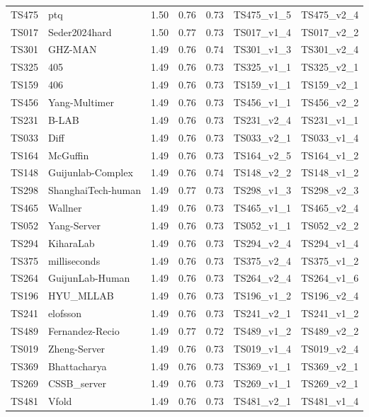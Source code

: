 \begin{table}[ht]
{\begin{tabular}{llrrrll}
TS475 & ptq & 1.50 & 0.76 & 0.73 & TS475\_v1\_5 & TS475\_v2\_4 \\ 
TS017 & Seder2024hard & 1.50 & 0.77 & 0.73 & TS017\_v1\_4 & TS017\_v2\_2 \\ 
TS301 & GHZ-MAN & 1.49 & 0.76 & 0.74 & TS301\_v1\_3 & TS301\_v2\_4 \\ 
TS325 & 405 & 1.49 & 0.76 & 0.73 & TS325\_v1\_1 & TS325\_v2\_1 \\ 
TS159 & 406 & 1.49 & 0.76 & 0.73 & TS159\_v1\_1 & TS159\_v2\_1 \\ 
TS456 & Yang-Multimer & 1.49 & 0.76 & 0.73 & TS456\_v1\_1 & TS456\_v2\_2 \\ 
TS231 & B-LAB & 1.49 & 0.76 & 0.73 & TS231\_v2\_4 & TS231\_v1\_1 \\ 
TS033 & Diff & 1.49 & 0.76 & 0.73 & TS033\_v2\_1 & TS033\_v1\_4 \\ 
TS164 & McGuffin & 1.49 & 0.76 & 0.73 & TS164\_v2\_5 & TS164\_v1\_2 \\ 
TS148 & Guijunlab-Complex & 1.49 & 0.76 & 0.74 & TS148\_v2\_2 & TS148\_v1\_2 \\ 
TS298 & ShanghaiTech-human & 1.49 & 0.77 & 0.73 & TS298\_v1\_3 & TS298\_v2\_3 \\ 
TS465 & Wallner & 1.49 & 0.76 & 0.73 & TS465\_v1\_1 & TS465\_v2\_4 \\ 
TS052 & Yang-Server & 1.49 & 0.76 & 0.73 & TS052\_v1\_1 & TS052\_v2\_2 \\ 
TS294 & KiharaLab & 1.49 & 0.76 & 0.73 & TS294\_v2\_4 & TS294\_v1\_4 \\ 
TS375 & milliseconds & 1.49 & 0.76 & 0.73 & TS375\_v2\_4 & TS375\_v1\_2 \\ 
TS264 & GuijunLab-Human & 1.49 & 0.76 & 0.73 & TS264\_v2\_4 & TS264\_v1\_6 \\ 
TS196 & HYU\_MLLAB & 1.49 & 0.76 & 0.73 & TS196\_v1\_2 & TS196\_v2\_4 \\ 
TS241 & elofsson & 1.49 & 0.76 & 0.73 & TS241\_v2\_1 & TS241\_v1\_2 \\ 
TS489 & Fernandez-Recio & 1.49 & 0.77 & 0.72 & TS489\_v1\_2 & TS489\_v2\_2 \\ 
TS019 & Zheng-Server & 1.49 & 0.76 & 0.73 & TS019\_v1\_4 & TS019\_v2\_4 \\ 
TS369 & Bhattacharya & 1.49 & 0.76 & 0.73 & TS369\_v1\_1 & TS369\_v2\_1 \\ 
TS269 & CSSB\_server & 1.49 & 0.76 & 0.73 & TS269\_v1\_1 & TS269\_v2\_1 \\ 
TS481 & Vfold & 1.49 & 0.76 & 0.73 & TS481\_v2\_1 & TS481\_v1\_4 \\ 

\end{tabular}}
\end{table}
